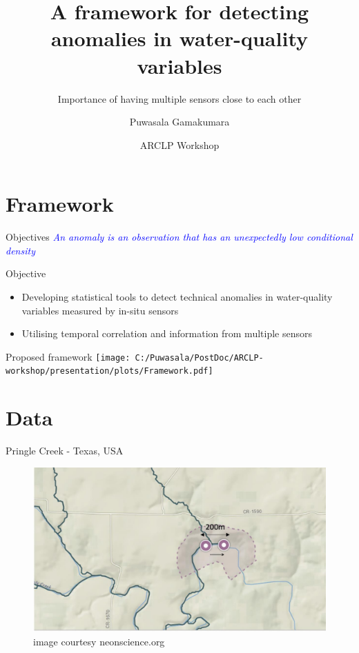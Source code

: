 \documentclass[14pt,ignorenonframetext,compress]{beamer}
\title[]{A framework for detecting anomalies in water-quality
variables}
\subtitle{Importance of having multiple sensors close to each other}
\author[
        Puwasala Gamakumara
    ]{Puwasala Gamakumara}
\date[
      ARCLP Workshop
  ]{
      ARCLP Workshop
        }
\providecommand{\tightlist}{%
  \setlength{\itemsep}{0pt}\setlength{\parskip}{0pt}}
\begin{document}
  \begin{frame}[plain]
  \titlepage
  \end{frame}



\hypertarget{framework}{%
\section{Framework}\label{framework}}

\begin{frame}{Objectives}
\protect\hypertarget{objectives}{}
\textcolor{blue}{\emph{An anomaly is an observation that has an unexpectedly low conditional density}}

\begin{block}{Objective}
\protect\hypertarget{objective}{}
\begin{itemize}
\tightlist
\item
  Developing statistical tools to detect technical anomalies in
  water-quality variables measured by in-situ sensors
\item
  Utilising temporal correlation and information from multiple sensors
\end{itemize}
\end{block}
\end{frame}

\begin{frame}{Proposed framework}
\protect\hypertarget{proposed-framework}{}
\texttt{[image: C:/Puwasala/PostDoc/ARCLP-workshop/presentation/plots/Framework.pdf]}
\end{frame}

\hypertarget{data}{%
\section{Data}\label{data}}

\begin{frame}{Pringle Creek - Texas, USA}
\protect\hypertarget{pringle-creek---texas-usa}{}
\begin{figure}
\includegraphics[width=1\linewidth]{plots/Pringle-creek-map} \caption{image courtesy neonscience.org}\label{fig:pringle-creek-map}
\end{figure}
\end{frame}
\end{document}
